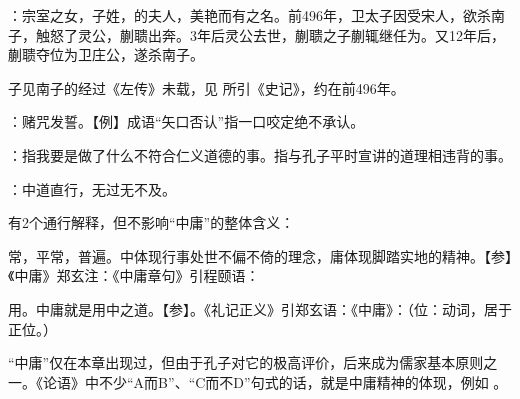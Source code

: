 {
\begin{lyitemize}
\item {}：宗室之女，子姓，的夫人，美艳而有之名。前496年，卫太子因受宋人，欲杀南子，触怒了灵公，蒯聩出奔。3年后灵公去世，蒯聩之子蒯辄继任为。又12年后，蒯聩夺位为卫庄公，遂杀南子。

子见南子的经过《左传》未载，见  所引《史记》，约在前496年。

\item {}：赌咒发誓。【例】成语“矢口否认”指一口咬定绝不承认。
\item {}：指我要是做了什么不符合仁义道德的事。指与孔子平时宣讲的道理相违背的事。
\end{lyitemize}
}
{} %


{
\item {}：中道直行，无过无不及。

有2个通行解释，但不影响“中庸”的整体含义：
\begin{lyitemize}
\item 常，平常，普遍。中体现行事处世不偏不倚的理念，庸体现脚踏实地的精神。【参】《中庸》郑玄注：《中庸章句》引程颐语：
\item 用。中庸就是用中之道。【参】。《礼记正义》引郑玄语：《中庸》：（位：动词，居于正位。）
\end{lyitemize}

“中庸”仅在本章出现过，但由于孔子对它的极高评价，后来成为儒家基本原则之一。《论语》中不少“A而B”、“C而不D”句式的话，就是中庸精神的体现，例如           。
}
{}


